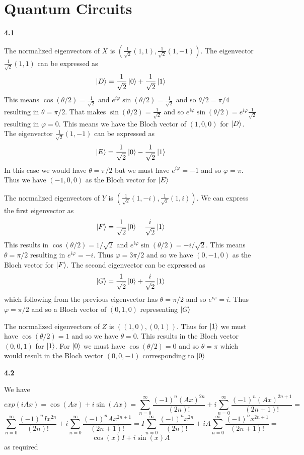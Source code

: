 \section{Quantum Circuits}

\textbf{4.1}

The normalized eigenvectors of $X$ is $ \left(\frac{1}{\sqrt{2}}(1,1),\frac{1}{\sqrt{2}}(1,-1)\right)$. The eigenvector $\frac{1}{\sqrt{2}}(1,1)$ can be expressed as
\[\ket{D}=\frac{1}{\sqrt{2}}\ket{0} + \frac{1}{\sqrt{2}}\ket{1}\]
This means $ \cos(\theta/2) = \frac{1}{\sqrt{2}}$ and $e^{i\varphi}\sin(\theta/2) = \frac{1}{\sqrt{2}}$ and so $\theta/2 = \pi/4$ resulting in $ \theta = \pi/2$. That makes $\sin(\theta/2) =\frac{1}{\sqrt{2}}$ and so $e^{i\varphi}\sin(\theta/2)  = e^{i\varphi}\frac{1}{\sqrt{2}}$ resulting in $\varphi = 0$. This means we have the Bloch vector of $ (1,0,0)$ for $\ket{D}$. The eigenvector $\frac{1}{\sqrt{2}}(1,-1)$ can be expressed as 
\[\ket{E} = \frac{1}{\sqrt{2}}\ket{0} - \frac{1}{\sqrt{2}}\ket{1}\]
In this case we would have $\theta = \pi/2$ but we must have $ e^{i\varphi} = -1$ and so $\varphi = \pi$. Thus we have $(-1,0,0)$ as the Bloch vector for $\ket{E}$

The normalized eigenvectors of $Y$ is $ \left(\frac{1}{\sqrt{2}}(1,-i),\frac{1}{\sqrt{2}}(1,i)\right)$. We can express the first eigenvector as
\[\ket{F} = \frac{1}{\sqrt{2}}\ket{0} - \frac{i}{\sqrt{2}}\ket{1}\]
This results in $ \cos(\theta/2) = 1/\sqrt{2}$ and $e^{i\varphi}\sin(\theta/2) = -i/\sqrt{2}$. This means $\theta = \pi/2$ resulting in $e^{i\varphi} = -i$. Thus $\varphi = 3\pi/2$ and so we have $(0,-1,0)$ as the Bloch vector for $\ket{F}$. The second eigenvector can be expressed as
\[\ket{G} = \frac{1}{\sqrt{2}}\ket{0} +\frac{i}{\sqrt{2}}\ket{1}\]
which following from the previous eigenvector has $ \theta = \pi/2$ and so $e^{i\varphi} = i$. Thus $ \varphi = \pi/2$ and so a Bloch vector of $(0,1,0)$ representing $\ket{G}$

The normalized eigenvectors of $Z$ is $ \left((1,0),(0,1)\right)$. Thus for $\ket{1}$ we must have $ \cos(\theta/2) = 1$ and so we have $ \theta = 0$. This results in the Bloch vector $(0,0,1)$ for $\ket{1}$. For $\ket{0}$ we must have $ \cos(\theta/2) = 0$ and so $\theta = \pi$ which would result in the Bloch vector $(0,0,-1)$ corresponding to $\ket{0}$

\textbf{4.2}

We have 
\[exp(iAx) = \cos(Ax) + i\sin(Ax) = \sum_{n=0}^\infty \frac{(-1)^n(Ax)^{2n}}{(2n)!} +i\sum_{n=0}^\infty \frac{(-1)^n(Ax)^{2n+1}}{(2n+1)!} = \]
\[\sum_{n=0}^\infty \frac{(-1)^nIx^{2n}}{(2n)!} +i\sum_{n=0}^\infty \frac{(-1)^nAx^{2n+1}}{(2n+1)!} =I\sum_{n=0}^\infty \frac{(-1)^nx^{2n}}{(2n)!} +iA\sum_{n=0}^\infty \frac{(-1)^nx^{2n+1}}{(2n+1)!} =  \]
\[\cos(x)I + i\sin(x) A\] as required


